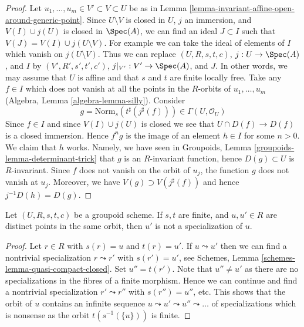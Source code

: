 \begin{proof}
Let $u_1, \ldots, u_m \in V' \subset V \subset U$ be as in
Lemma \ref{lemma-invariant-affine-open-around-generic-point}.
Since $U \setminus V$ is closed in $U$, $j$ an immersion, and $V(I) \cup j(U)$
is closed in $\Spec(A)$, we can find an ideal
$J \subset I$ such that $V(J) = V(I) \cup j(U \setminus V)$.
For example we can take the ideal of elements of $I$ which
vanish on $j(U \setminus V)$. Thus we can replace
$(U, R, s, t, c)$, $j : U \to \Spec(A)$, and $I$ by
$(V', R', s', t', c')$, $j|_{V'} : V' \to \Spec(A)$, and $J$.
In other words, we may assume that $U$ is affine and that
$s$ and $t$ are finite locally free.
Take any $f \in I$ which does not vanish at all the
points in the $R$-orbits of $u_1, \ldots, u_m$
(Algebra, Lemma \ref{algebra-lemma-silly}). Consider
$$
g = \text{Norm}_s(t^\sharp(j^\sharp(f))) \in \Gamma(U, \mathcal{O}_U)
$$
Since $f \in I$ and since $V(I) \cup j(U)$ is closed we see that
$U \cap D(f) \to D(f)$ is a closed immersion. Hence $f^ng$ is the
image of an element $h \in I$ for some $n > 0$. We claim that $h$ works.
Namely, we have seen in
Groupoids, Lemma \ref{groupoids-lemma-determinant-trick}
that $g$ is an $R$-invariant function, hence $D(g) \subset U$
is $R$-invariant. Since $f$ does not vanish on the orbit of $u_j$,
the function $g$ does not vanish at $u_j$. Moreover, we have
$V(g) \supset V(j^\sharp(f))$ and hence $j^{-1}D(h) = D(g)$.
\end{proof}

\begin{lemma}
\label{lemma-no-specializations-map-to-same-point}
Let $(U, R, s, t, c)$ be a groupoid scheme. If $s, t$ are finite,
and $u, u' \in R$ are distinct points in the same orbit,
then $u'$ is not a specialization of $u$.
\end{lemma}

\begin{proof}
Let $r \in R$ with $s(r) = u$ and $t(r) = u'$. If $u \leadsto u'$
then we can find a nontrivial specialization $r \leadsto r'$ with
$s(r') = u'$, see 
Schemes, Lemma \ref{schemes-lemma-quasi-compact-closed}.
Set $u'' = t(r')$. Note that $u'' \not = u'$ as there are no
specializations in the fibres of a finite morphism.
Hence we can continue and find a nontrivial specialization
$r' \leadsto r''$ with $s(r'') = u''$, etc. This shows that the
orbit of $u$ contains an infinite sequence
$u \leadsto u' \leadsto u'' \leadsto \ldots$
of specializations which is nonsense as the orbit
$t(s^{-1}(\{u\}))$ is finite.
\end{proof}

